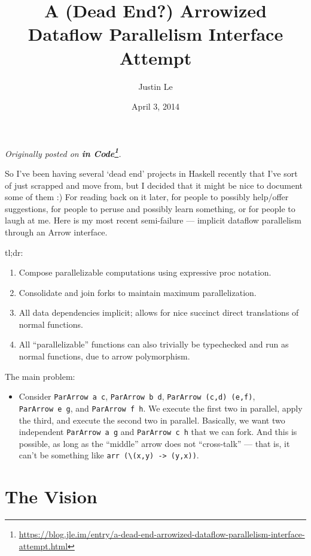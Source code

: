 \documentclass[]{article}
\title{A (Dead End?) Arrowized Dataflow Parallelism Interface Attempt}
\author{Justin Le}
\date{April 3, 2014}
\renewcommand{\href}[2]{#2\footnote{\url{#1}}}
\begin{document}
\maketitle

\emph{Originally posted on
\textbf{\href{https://blog.jle.im/entry/a-dead-end-arrowized-dataflow-parallelism-interface-attempt.html}{in
Code}}.}

So I've been having several `dead end' projects in Haskell recently that I've
sort of just scrapped and move from, but I decided that it might be nice to
document some of them :) For reading back on it later, for people to possibly
help/offer suggestions, for people to peruse and possibly learn something, or
for people to laugh at me. Here is my most recent semi-failure --- implicit
dataflow parallelism through an Arrow interface.

tl;dr:

\begin{enumerate}
\def\labelenumi{\arabic{enumi}.}
\tightlist
\item
  Compose parallelizable computations using expressive proc notation.
\item
  Consolidate and join forks to maintain maximum parallelization.
\item
  All data dependencies implicit; allows for nice succinct direct translations
  of normal functions.
\item
  All ``parallelizable'' functions can also trivially be typechecked and run as
  normal functions, due to arrow polymorphism.
\end{enumerate}

The main problem:

\begin{itemize}
\tightlist
\item
  Consider \texttt{ParArrow\ a\ c}, \texttt{ParArrow\ b\ d},
  \texttt{ParArrow\ (c,d)\ (e,f)}, \texttt{ParArrow\ e\ g}, and
  \texttt{ParArrow\ f\ h}. We execute the first two in parallel, apply the
  third, and execute the second two in parallel. Basically, we want two
  independent \texttt{ParArrow\ a\ g} and \texttt{ParArrow\ c\ h} that we can
  fork. And this is possible, as long as the ``middle'' arrow does not
  ``cross-talk'' --- that is, it can't be something like
  \texttt{arr\ (\textbackslash{}(x,y)\ -\textgreater{}\ (y,x))}.
\end{itemize}

\hypertarget{the-vision}{%
\section{The Vision}\label{the-vision}}
\end{document}
